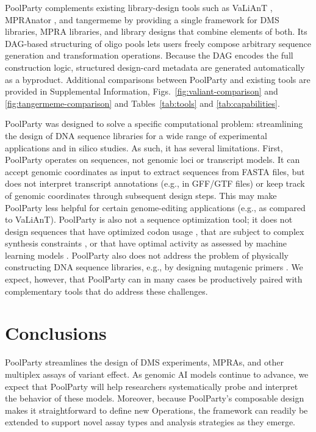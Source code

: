 \documentclass[pdflatex,sn-vancouver-num,referee,oneside]{sn-jnl}
\newif\ifshowquoted
\newcommand{\quoted}[1]{\ifshowquoted\textcolor{quotedtext}{#1}\else#1\fi}
\begin{document}
\quoted{PoolParty complements existing library-design tools such as VaLiAnT \citep{Barbon2022th}, MPRAnator \citep{GeorgakopoulosSoares2017gb}, and tangermeme \citep{Schreiber2025nd} by providing a single framework for DMS libraries, MPRA libraries, and library designs that combine elements of both.} Its DAG-based structuring of oligo pools lets users freely compose arbitrary sequence generation and transformation operations. Because the DAG encodes the full construction logic, structured design-card metadata are generated automatically as a byproduct. \quoted{Additional comparisons between PoolParty and existing tools are provided in Supplemental Information, Figs.~\ref{fig:valiant-comparison} and \ref{fig:tangermeme-comparison} and Tables~\ref{tab:tools} and \ref{tab:capabilities}.}

\quoted{PoolParty was designed to solve a specific computational problem: streamlining the design of DNA sequence libraries for a wide range of experimental applications and in silico studies. As such, it has several limitations. First, PoolParty operates on sequences, not genomic loci or transcript models. It can accept genomic coordinates as input to extract sequences from FASTA files, but does not interpret transcript annotations (e.g., in GFF/GTF files) or keep track of genomic coordinates through subsequent design steps. This may make PoolParty less helpful for certain genome-editing applications (e.g., as compared to VaLiAnT). PoolParty is also not a sequence optimization tool; it does not design sequences that have optimized codon usage \citep{Swainston2017rb}, that are subject to complex synthesis constraints \citep{Zulkower2020jk}, or that have optimal activity as assessed by machine learning models \citep{Schreiber2025ledidi}. PoolParty also does not address the problem of physically constructing DNA sequence libraries, e.g., by designing mutagenic primers \citep{Hiraga2021yg}. We expect, however, that PoolParty can in many cases be productively paired with complementary tools that do address these challenges.}

\section*{Conclusions}\label{sec:conclusions}

PoolParty streamlines the design of DMS experiments, MPRAs, and other multiplex assays of variant effect. As genomic AI models continue to advance, we expect that PoolParty will help researchers systematically probe and interpret the behavior of these models. Moreover, because PoolParty's composable design makes it straightforward to define new Operations, the framework can readily be extended to support novel assay types and analysis strategies as they emerge.
\end{document}
